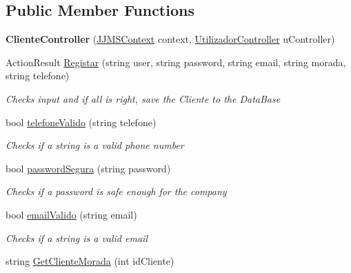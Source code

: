 \subsection*{Public Member Functions}
\begin{DoxyCompactItemize}
\item 
\mbox{\label{classmvc_j_j_m_s_1_1_controllers_1_1_cliente_controller_a55a36c3b859c2bbabf552b1526c18cef}} 
{\bfseries Cliente\+Controller} (\mbox{\hyperlink{classmvc_j_j_m_s_1_1_data_1_1_j_j_m_s_context}{J\+J\+M\+S\+Context}} context, \mbox{\hyperlink{classmvc_j_j_m_s_1_1_controllers_1_1_utilizador_controller}{Utilizador\+Controller}} u\+Controller)
\item 
Action\+Result \mbox{\hyperlink{classmvc_j_j_m_s_1_1_controllers_1_1_cliente_controller_a31325ea0231ffa6f09996a9f61f1731b}{Registar}} (string user, string password, string email, string morada, string telefone)
\begin{DoxyCompactList}\small\item\em Checks input and if all is right, save the Cliente to the Data\+Base \end{DoxyCompactList}\item 
bool \mbox{\hyperlink{classmvc_j_j_m_s_1_1_controllers_1_1_cliente_controller_a55f13fda1a4342595d427b8bfc9a2978}{telefone\+Valido}} (string telefone)
\begin{DoxyCompactList}\small\item\em Checks if a string is a valid phone number \end{DoxyCompactList}\item 
bool \mbox{\hyperlink{classmvc_j_j_m_s_1_1_controllers_1_1_cliente_controller_a0027e8277cd9552a1122e12547ec10c6}{password\+Segura}} (string password)
\begin{DoxyCompactList}\small\item\em Checks if a password is safe enough for the company \end{DoxyCompactList}\item 
bool \mbox{\hyperlink{classmvc_j_j_m_s_1_1_controllers_1_1_cliente_controller_a0f8b63358a35d40ad0bdda9442d9a677}{email\+Valido}} (string email)
\begin{DoxyCompactList}\small\item\em Checks if a string is a valid email \end{DoxyCompactList}\item 
string \mbox{\hyperlink{classmvc_j_j_m_s_1_1_controllers_1_1_cliente_controller_a6925f8c7f2234512eceb9e027c987ca9}{Get\+Cliente\+Morada}} (int id\+Cliente)

\end{DoxyCompactItemize}
